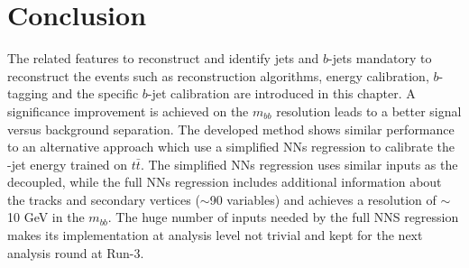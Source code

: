 \section{Conclusion}
\label{Jet:Conc}
The related features to reconstruct and identify jets and $b$-jets mandatory to reconstruct the \HHyybb events such as reconstruction algorithms, energy calibration, $b$-tagging and the specific $b$-jet calibration are introduced in this chapter. A significance improvement is achieved on the $m_{bb}$ resolution leads to a better signal versus background separation. The developed method shows similar performance to an alternative approach which use a simplified NNs regression to calibrate the \bq-jet energy trained on $t\bar{t}$. The simplified NNs regression uses similar inputs as the decoupled, while the full NNs regression includes additional information about the tracks and secondary vertices ($\sim$90 variables) and achieves a resolution of $\sim$10 GeV in the $m_{bb}$. The huge number of inputs needed by the full NNS regression makes its implementation at analysis level not trivial and kept for the next analysis round at Run-3.